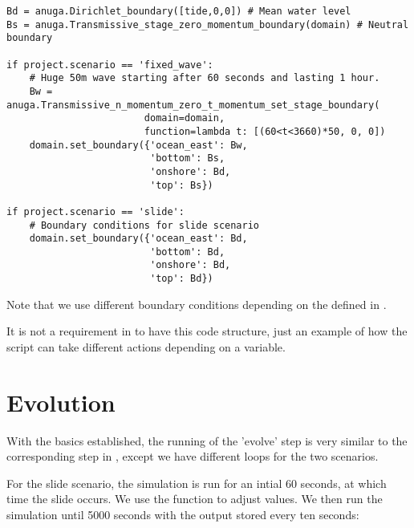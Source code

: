 \documentclass{manual}
\begin{document}
\begin{verbatim}
Bd = anuga.Dirichlet_boundary([tide,0,0]) # Mean water level
Bs = anuga.Transmissive_stage_zero_momentum_boundary(domain) # Neutral boundary

if project.scenario == 'fixed_wave':
    # Huge 50m wave starting after 60 seconds and lasting 1 hour.
    Bw = anuga.Transmissive_n_momentum_zero_t_momentum_set_stage_boundary(
                        domain=domain,
                        function=lambda t: [(60<t<3660)*50, 0, 0])
    domain.set_boundary({'ocean_east': Bw,
                         'bottom': Bs,
                         'onshore': Bd,
                         'top': Bs})

if project.scenario == 'slide':
    # Boundary conditions for slide scenario
    domain.set_boundary({'ocean_east': Bd,
                         'bottom': Bd,
                         'onshore': Bd,
                         'top': Bd})
\end{verbatim}

Note that we use different boundary conditions depending on the 
defined in .

It is not a requirement in \anuga to have this code structure, just an example of
how the script can take different actions depending on a variable.

\section{Evolution}

With the basics established, the running of the 'evolve' step is
very similar to the corresponding step in , except we have different 
loops for the two scenarios.

For the slide scenario, the simulation is run for an intial 60 seconds, at which time
the slide occurs.  We use the function  to adjust 
values.  We then run the simulation until 5000 seconds with the output stored
every ten seconds:
\end{document}

